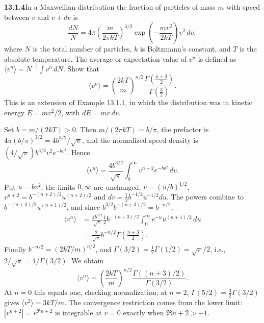 \par\bigskip
\noindent\textbf{13.1.4}\quad In a Maxwellian distribution the fraction of
particles of mass $m$ with speed between $v$ and $v+dv$ is
\[
\frac{dN}{N}=4\pi\left(\frac{m}{2\pi kT}\right)^{3/2}
\exp\left(-\frac{mv^{2}}{2kT}\right)v^{2}\,dv,
\]
where $N$ is the total number of particles, $k$ is Boltzmann's constant, and
$T$ is the absolute temperature. The average or expectation value of $v^{n}$
is defined as $\langle v^{n}\rangle=N^{-1}\int v^{n}\,dN$. Show that
\[
\langle v^{n}\rangle=\left(\frac{2kT}{m}\right)^{n/2}
\frac{\Gamma(\frac{n+3}{2})}{\Gamma(\frac{3}{2})}.
\]
This is an extension of Example 13.1.1, in which the distribution was in
kinetic energy $E=mv^{2}/2$, with $dE=mv\,dv$.
\par\smallskip
{}
\solution
{}
Set $b=m/(2kT)>0$.  Then $m/(2\pi kT)=b/\pi$, the prefactor is
$4\pi(b/\pi)^{3/2}=4b^{3/2}/\sqrt\pi$, and the normalized speed
density is $(4/\sqrt\pi)b^{3/2}v^2e^{-bv^2}$.  Hence
\[
\langle v^n\rangle=\frac{4b^{3/2}}{\sqrt\pi}
\int_0^\infty v^{n+2}e^{-bv^2}\,dv.
\]
Put $u=bv^2$; the limits $0,\infty$ are unchanged, $v=(u/b)^{1/2}$,
$v^{n+2}=b^{-(n+2)/2}u^{(n+2)/2}$ and
$dv=\tfrac12b^{-1/2}u^{-1/2}du$.  The powers combine to
$b^{-(n+3)/2}u^{(n+1)/2}$, and since
$b^{3/2}b^{-(n+3)/2}=b^{-n/2}$,
\begin{align*}
\langle v^n\rangle
&=\frac{4b^{3/2}}{\sqrt\pi}\frac12b^{-(n+3)/2}
 \int_0^\infty e^{-u}u^{(n+1)/2}\,du\\
&=\frac{2}{\sqrt\pi}b^{-n/2}\Gamma\left(\frac{n+3}2\right).
\end{align*}
Finally $b^{-n/2}=(2kT/m)^{n/2}$, and
$\Gamma(3/2)=\tfrac12\Gamma(1/2)=\sqrt\pi/2$, i.e.,
$2/\sqrt\pi=1/\Gamma(3/2)$.  We obtain
\[
\boxed{\langle v^n\rangle=
\left(\frac{2kT}{m}\right)^{n/2}
\frac{\Gamma((n+3)/2)}{\Gamma(3/2)}}.
\]
At $n=0$ this equals one, checking normalization; at $n=2$,
$\Gamma(5/2)=\tfrac32\Gamma(3/2)$ gives $\langle v^2\rangle=3kT/m$.
The convergence restriction comes from the lower limit:
$|v^{n+2}|=v^{\Re n+2}$ is integrable at $v=0$ exactly when
$\Re n+2>-1$.


